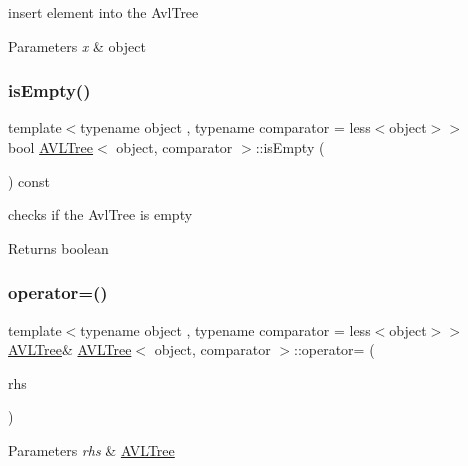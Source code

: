 insert element into the Avl\+Tree 


\begin{DoxyParams}{Parameters}
{\em x} & object \\
\hline
\end{DoxyParams}
\hypertarget{class_a_v_l_tree_a27d1c8fac94be14ce1ab128aebe84914}{}\label{class_a_v_l_tree_a27d1c8fac94be14ce1ab128aebe84914} 
\subsubsection{\texorpdfstring{is\+Empty()}{isEmpty()}}
{\footnotesize\ttfamily template$<$typename object , typename comparator  = less$<$object$>$$>$ \\
bool \hyperlink{class_a_v_l_tree}{A\+V\+L\+Tree}$<$ object, comparator $>$\+::is\+Empty (\begin{DoxyParamCaption}{ }\end{DoxyParamCaption}) const\hspace{0.3cm}{\ttfamily [inline]}}



checks if the Avl\+Tree is empty 

\begin{DoxyReturn}{Returns}
boolean 
\end{DoxyReturn}
\hypertarget{class_a_v_l_tree_a449ca1d3b6daeeb26870d4f0c9723be2}{}\label{class_a_v_l_tree_a449ca1d3b6daeeb26870d4f0c9723be2} 
\subsubsection{\texorpdfstring{operator=()}{operator=()}}
{\footnotesize\ttfamily template$<$typename object , typename comparator  = less$<$object$>$$>$ \\
\hyperlink{class_a_v_l_tree}{A\+V\+L\+Tree}\& \hyperlink{class_a_v_l_tree}{A\+V\+L\+Tree}$<$ object, comparator $>$\+::operator= (\begin{DoxyParamCaption}\item[{const \hyperlink{class_a_v_l_tree}{A\+V\+L\+Tree}$<$ object, comparator $>$ \&}]{rhs }\end{DoxyParamCaption})\hspace{0.3cm}{\ttfamily [inline]}}


\begin{DoxyParams}{Parameters}
{\em rhs} & \hyperlink{class_a_v_l_tree}{A\+V\+L\+Tree} \\
\hline
\end{DoxyParams}
\hypertarget{class_a_v_l_tree_a9ad949733d3d166d12125cd7ab483fde}{}\label{class_a_v_l_tree_a9ad949733d3d166d12125cd7ab483fde} 
